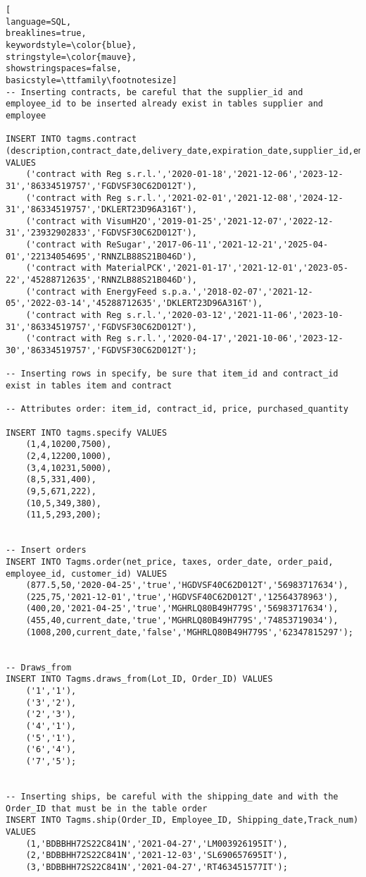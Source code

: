\begin{lstlisting}[
language=SQL,
breaklines=true,
keywordstyle=\color{blue},
stringstyle=\color{mauve},
showstringspaces=false,
basicstyle=\ttfamily\footnotesize]
-- Inserting contracts, be careful that the supplier_id and employee_id to be inserted already exist in tables supplier and employee

INSERT INTO tagms.contract (description,contract_date,delivery_date,expiration_date,supplier_id,employee_id) VALUES
    ('contract with Reg s.r.l.','2020-01-18','2021-12-06','2023-12-31','86334519757','FGDVSF30C62D012T'),
    ('contract with Reg s.r.l.','2021-02-01','2021-12-08','2024-12-31','86334519757','DKLERT23D96A316T'),
    ('contract with VisumH2O','2019-01-25','2021-12-07','2022-12-31','23932902833','FGDVSF30C62D012T'),
    ('contract with ReSugar','2017-06-11','2021-12-21','2025-04-01','22134054695','RNNZLB88S21B046D'),
    ('contract with MaterialPCK','2021-01-17','2021-12-01','2023-05-22','45288712635','RNNZLB88S21B046D'),
    ('contract with EnergyFeed s.p.a.','2018-02-07','2021-12-05','2022-03-14','45288712635','DKLERT23D96A316T'),
    ('contract with Reg s.r.l.','2020-03-12','2021-11-06','2023-10-31','86334519757','FGDVSF30C62D012T'),
    ('contract with Reg s.r.l.','2020-04-17','2021-10-06','2023-12-30','86334519757','FGDVSF30C62D012T');

-- Inserting rows in specify, be sure that item_id and contract_id exist in tables item and contract

-- Attributes order: item_id, contract_id, price, purchased_quantity

INSERT INTO tagms.specify VALUES
    (1,4,10200,7500),
    (2,4,12200,1000),
    (3,4,10231,5000),
    (8,5,331,400),
    (9,5,671,222),
    (10,5,349,380),
    (11,5,293,200);


-- Insert orders
INSERT INTO Tagms.order(net_price, taxes, order_date, order_paid, employee_id, customer_id) VALUES
    (877.5,50,'2020-04-25','true','HGDVSF40C62D012T','56983717634'),
    (225,75,'2021-12-01','true','HGDVSF40C62D012T','12564378963'),
    (400,20,'2021-04-25','true','MGHRLQ80B49H779S','56983717634'),
    (455,40,current_date,'true','MGHRLQ80B49H779S','74853719034'),
    (1008,200,current_date,'false','MGHRLQ80B49H779S','62347815297');


-- Draws_from
INSERT INTO Tagms.draws_from(Lot_ID, Order_ID) VALUES
    ('1','1'),
    ('3','2'),
    ('2','3'),
    ('4','1'),
    ('5','1'),
    ('6','4'),
    ('7','5');


-- Inserting ships, be careful with the shipping_date and with the Order_ID that must be in the table order
INSERT INTO Tagms.ship(Order_ID, Employee_ID, Shipping_date,Track_num) VALUES
    (1,'BDBBHH72S22C841N','2021-04-27','LM003926195IT'),
    (2,'BDBBHH72S22C841N','2021-12-03','SL690657695IT'),
    (3,'BDBBHH72S22C841N','2021-04-27','RT463451577IT');


\end{lstlisting}